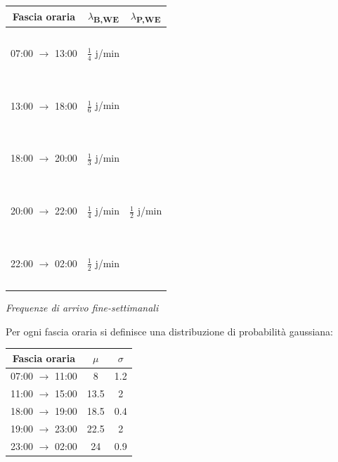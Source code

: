 \documentclass[a4paper, 12pt]{article}
\newcommand{\xmark}[0]{\ding{55}}
\begin{document}
\begin{minipage}{.5\textwidth}
\centering
\begin{tabular}{ |c|c|c| }
	\hline
    \cellcolor{cellcolor}Fascia oraria & \cellcolor{cellcolor}$\lambda${\textsubscript{B,WE}}
    &\cellcolor{cellcolor} $\lambda${\textsubscript{P,WE}} \\
    \hline
    \hline
    
    \ &\ &\ \\
	07:00 $\rightarrow$ 13:00 & $\frac{1}{4}$ j/min & \xmark \\ 
    \ &\ &\ \\
    \hline
    
    \ &\ &\ \\
	13:00 $\rightarrow$ 18:00 & $\frac{1}{6}$ j/min & \xmark \\
    \ &\ &\ \\
    \hline
    
    \ &\ &\ \\
	18:00 $\rightarrow$ 20:00 & $\frac{1}{3}$ j/min & \xmark \\
    \ &\ &\ \\
    \hline
    
    \ &\ &\ \\
	20:00 $\rightarrow$ 22:00 & $\frac{1}{4}$ j/min & $\frac{1}{2}$ j/min \\
    \ &\ &\ \\
    \hline
    
    \ &\ &\ \\
	22:00 $\rightarrow$ 02:00 & $\frac{1}{2}$ j/min & \xmark \\
    \ &\ &\ \\
    \hline
\end{tabular}
\bigskip
              
\textit{Frequenze di arrivo fine-settimanali} 
\end{minipage} 
\bigskip

Per ogni fascia oraria si definisce una distribuzione di probabilità gaussiana:\\

\begin{table}[H]
\centering
\begin{tabular}{ |c|c|c| }
	\hline
    \cellcolor{cellcolor} Fascia oraria & \cellcolor{cellcolor}$\mu$ & \cellcolor{cellcolor}$\sigma$\\
	\hline
    \hline

  	07:00 $\rightarrow$ 11:00 & 8 & 1.2 \\
    \hline	
	
	11:00 $\rightarrow$ 15:00 & 13.5 & 2 \\
    \hline
  
	18:00 $\rightarrow$ 19:00 & 18.5 & 0.4 \\  
    \hline
    
	19:00 $\rightarrow$ 23:00 & 22.5 & 2\\
    \hline
    
    23:00 $\rightarrow$ 02:00 & 24 & 0.9 \\
    \hline    
\end{tabular}
\end{table}
\end{document}

